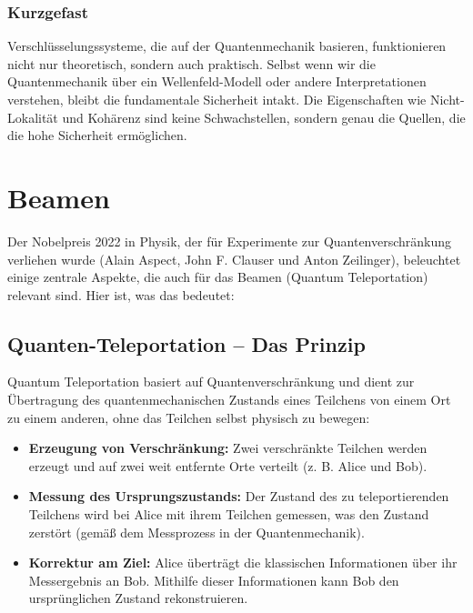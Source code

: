 \documentclass[12pt,a4paper]{article}
\begin{document}
	\subsubsection{Kurzgefast}
	
	Verschlüsselungssysteme, die auf der Quantenmechanik basieren, funktionieren nicht nur theoretisch, sondern auch praktisch. Selbst wenn wir die Quantenmechanik über ein Wellenfeld-Modell oder andere Interpretationen verstehen, bleibt die fundamentale Sicherheit intakt. Die Eigenschaften wie Nicht-Lokalität und Kohärenz sind keine Schwachstellen, sondern genau die Quellen, die die hohe Sicherheit ermöglichen.
	
	
	

		\section{Beamen}
	
	
	Der Nobelpreis 2022 in Physik, der für Experimente zur Quantenverschränkung verliehen wurde (Alain Aspect, John F. Clauser und Anton Zeilinger), beleuchtet einige zentrale Aspekte, die auch für das Beamen (Quantum Teleportation) relevant sind. Hier ist, was das bedeutet:
	
	\subsection{Quanten-Teleportation – Das Prinzip}
	Quantum Teleportation basiert auf Quantenverschränkung und dient zur Übertragung des quantenmechanischen Zustands eines Teilchens von einem Ort zu einem anderen, ohne das Teilchen selbst physisch zu bewegen:
	\begin{itemize}
		\item \textbf{Erzeugung von Verschränkung:} Zwei verschränkte Teilchen werden erzeugt und auf zwei weit entfernte Orte verteilt (z. B. Alice und Bob).
		\item \textbf{Messung des Ursprungszustands:} Der Zustand des zu teleportierenden Teilchens wird bei Alice mit ihrem Teilchen gemessen, was den Zustand zerstört (gemäß dem Messprozess in der Quantenmechanik).
		\item \textbf{Korrektur am Ziel:} Alice überträgt die klassischen Informationen über ihr Messergebnis an Bob. Mithilfe dieser Informationen kann Bob den ursprünglichen Zustand rekonstruieren.
	\end{itemize}
	
\end{document}
